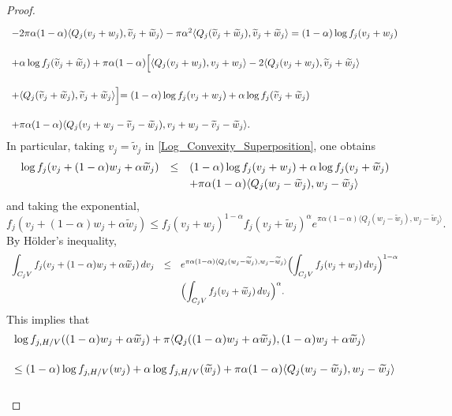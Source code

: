 \documentclass[10pt,a4paper]{amsart}
\newcommand{\ds}{\displaystyle}
\newcommand{\nm}{\noalign{\smallskip}}
\renewcommand{\tilde}{\widetilde}
\begin{document}
\begin{proof}
\begin{equation}
\begin{array}{lll}
    \nm 
    -2\pi \alpha(1-\alpha)\langle Q_j(v_j+w_j),\tilde v_j+\tilde w_j \rangle   -\pi \alpha^2 \langle Q_j(\tilde v_j+\tilde w_j),\tilde v_j+\tilde w_j  \rangle = (1-\alpha) \log f_j(v_j+w_j) \\ \\
    \nm 
    +\alpha \log f_j(\tilde v_j+\tilde w_j)+\pi \alpha(1-\alpha) \Bigl[ \langle Q_j(v_j+w_j),v_j+w_j\rangle-2\langle Q_j(v_j+w_j), \tilde v_j+\tilde w_j \rangle \\ \\
    \nm 
    +\langle Q_j(\tilde v_j+\tilde w_j),\tilde v_j+\tilde w_j \rangle \Bigl]=(1-\alpha) \log f_j(v_j+w_j)+\alpha \log f_j(\tilde v_j+\tilde w_j) \\ \\
    \nm 
    +\pi \alpha(1-\alpha) \langle Q_j(v_j+w_j-\tilde v_j-\tilde w_j),v_j+w_j-\tilde v_j-\tilde w_j \rangle.
    \end{array} \end{equation}
    In particular, taking $v_j=\tilde v_j$ in \cref{Log_Convexity_Superposition}, one obtains $$\begin{array}{lll}\log f_j(v_j+(1-\alpha)w_j+\alpha \tilde w_j) &\leq& (1-\alpha)\log f_j(v_j+w_j)+\alpha \log f_j(v_j+\tilde w_j) \\
    \nm 
    && +\pi \alpha(1-\alpha) \langle Q_j(w_j-\tilde w_j),w_j-\tilde w_j\rangle \end{array}$$ and taking the exponential, $$f_j(v_j+(1-\alpha)w_j+\alpha \tilde w_j) \leq f_j(v_j+w_j)^{1-\alpha}f_j(v_j+\tilde w_j)^{\alpha} e^{\pi \alpha (1-\alpha) \langle Q_j(w_j-\tilde w_j),w_j-\tilde w_j\rangle}.$$ By Hölder's inequality, $$\begin{array}{lll}
    \ds \int_{C_jV}f_j(v_j+(1-\alpha)w_j+\alpha \tilde w_j) \, dv_j &\leq& \ds e^{\pi \alpha(1-\alpha) \langle Q_j(w_j-\tilde w_j),w_j-\tilde w_j\rangle} \Bigl( \int_{C_jV}f_j(v_j+w_j)\, dv_j \Bigl)^{1-\alpha} \\
    \nm 
    && \ds \Bigl ( \int_{C_jV}f_j(v_j+\tilde w_j)\, dv_j\Bigl)^{\alpha}.
    \end{array}$$ This implies that $$\begin{array}{lll}
    \log f_{j,H/V}((1-\alpha)w_j+\alpha \tilde w_j)+\pi \langle Q_j((1-\alpha)w_j+\alpha \tilde w_j),(1-\alpha)w_j+\alpha \tilde w_j \rangle \\ \\
    \nm 
    \leq (1-\alpha)\log f_{j,H/V}(w_j)+\alpha \log f_{j,H/V}(\tilde w_j)+\pi \alpha(1-\alpha) \langle Q_j(w_j-\tilde w_j),w_j-\tilde w_j \rangle \\ \\

\end{array}$$
\end{proof}
\end{document}
